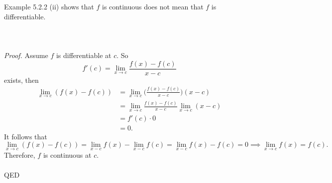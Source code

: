 \documentclass{article}
\begin{document}
            \\ \\
            Example 5.2.2 (ii) shows that $f$ is continuous does not mean that $f$ is differentiable.
            \\ \\
            \\ \\
            \textit{Proof.} Assume $f$ is differentiable at $c$. So
            \begin{equation*}
                f'(c) = \lim_{x \to c} \frac{f(x)-f(c)}{x-c}
            \end{equation*}
            exists, then
            \begin{align*}
                \lim_{x \to c} (f(x)-f(c)) &= \lim_{x \to c} \bigg(\frac{f(x)-f(c)}{x-c}\bigg)(x-c) \\
                & = \lim_{x \to c} \frac{f(x)-f(c)}{x-c} \lim_{x \to c}(x-c) \\
                & = f'(c) \cdot 0 \\
                & = 0.
            \end{align*}
            It follows that
            \begin{equation*}
                \lim_{x \to c} (f(x)-f(c)) = \lim_{x-c} f(x) - \lim_{x-c}f(c) = \lim_{x-c} f(x) - f(c) = 0 \implies \lim_{x \to c} f(x) = f(c).
            \end{equation*}
            Therefore, $f$ is continuous at $c$.
            \\ \\
            QED
            
\end{document}
